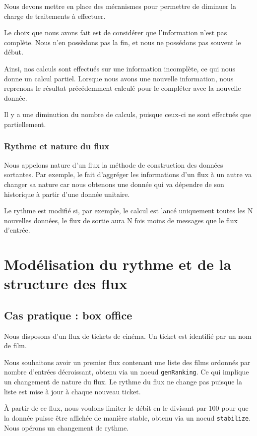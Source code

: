 \documentclass{llncs}
\begin{document}
Nous devons mettre en place des mécanismes pour permettre de diminuer la charge
de traitements à effectuer.

Le choix que nous avons fait est de considérer que l'information n'est pas complète.
Nous n'en possèdons pas la fin, et nous ne possédons pas souvent le début.

Ainsi, nos calculs sont effectués sur une information incomplète, ce qui nous
donne un calcul partiel.
Lorsque nous avons une nouvelle information, nous reprenons le résultat
précédemment calculé pour le compléter avec la nouvelle donnée.

Il y a une diminution du nombre de calculs, puisque ceux-ci ne sont effectués
que partiellement.

\subsubsection{Rythme et nature du flux}
Nous appelons nature d'un flux la méthode de construction des données sortantes.
Par exemple, le fait d'aggréger les informations d'un flux à un autre va changer
sa nature car nous obtenons une donnée qui va dépendre de son historique
à partir d'une donnée unitaire.

Le rythme est modifié si, par exemple, le calcul est lancé uniquement toutes les
N nouvelles données, le flux de sortie aura N fois moins de messages que le flux d'entrée.

\section{Modélisation du rythme et de la structure des flux}
\subsection{Cas pratique : box office}
Nous disposons d'un flux de tickets de cinéma.
Un ticket est identifié par un nom de film.

Nous souhaitons avoir un premier flux contenant une liste des films ordonnés par
nombre d'entrées décroissant, obtenu via un noeud \lstinline{genRanking}.
Ce qui implique un changement de nature du flux.
Le rythme du flux ne change pas puisque la liste est mise à jour à chaque nouveau
ticket.

À partir de ce flux, nous voulons limiter le débit en le divisant par 100 pour
que la donnée puisse être affichée de manière stable, obtenu via un noeud \lstinline{stabilize}.
Nous opérons un changement de rythme.
\end{document}
